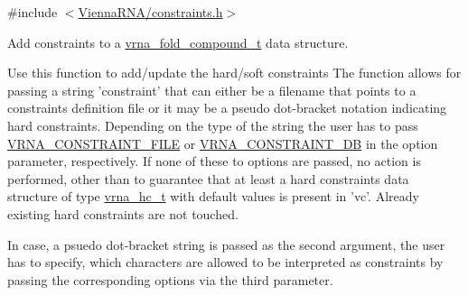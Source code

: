 {\ttfamily \#include $<$\hyperlink{constraints_8h}{Vienna\-R\-N\-A/constraints.\-h}$>$}



Add constraints to a \hyperlink{group__fold__compound_ga1b0cef17fd40466cef5968eaeeff6166}{vrna\-\_\-fold\-\_\-compound\-\_\-t} data structure. 

Use this function to add/update the hard/soft constraints The function allows for passing a string 'constraint' that can either be a filename that points to a constraints definition file or it may be a pseudo dot-\/bracket notation indicating hard constraints. Depending on the type of the string the user has to pass \hyperlink{group__constraints_ga62e0ed0c33002c09423de4e646f85a2b}{V\-R\-N\-A\-\_\-\-C\-O\-N\-S\-T\-R\-A\-I\-N\-T\-\_\-\-F\-I\-L\-E} or \hyperlink{group__constraints_ga4bfc2f15c4f261c62a11af9d2aa80c90}{V\-R\-N\-A\-\_\-\-C\-O\-N\-S\-T\-R\-A\-I\-N\-T\-\_\-\-D\-B} in the option parameter, respectively. If none of these to options are passed, no action is performed, other than to guarantee that at least a hard constraints data structure of type \hyperlink{group__constraints_gac7e4c4f8abe3163a68110c5bff24e01d}{vrna\-\_\-hc\-\_\-t} with default values is present in 'vc'. Already existing hard constraints are not touched.

In case, a psuedo dot-\/bracket string is passed as the second argument, the user has to specify, which characters are allowed to be interpreted as constraints by passing the corresponding options via the third parameter.

